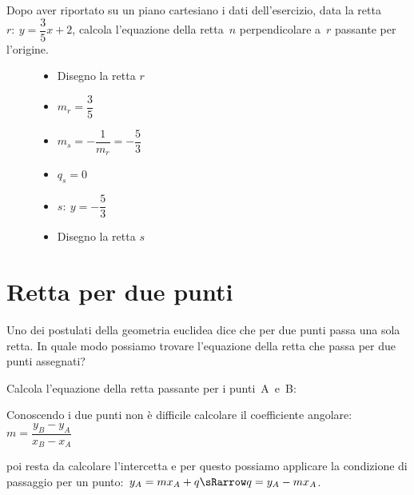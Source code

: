  \begin{esempio}
Dopo aver riportato su un piano cartesiano i dati dell'esercizio,
data la retta~\(r:~y = \dfrac{3}{5} x +2\), calcola l'equazione della 
retta~\(n\) perpendicolare a~\(r\) passante per l'origine.

\begin{inaccessibleblock}
 \begin{figure}[h]
\centering \hspace{-5mm}
 \begin{minipage}[]{.40\textwidth}
  \begin{itemize}
  \item Disegno la retta \(r\)
  \item \(m_r = \dfrac{3}{5}\)
  \item \(m_s = - \dfrac{1}{m_r} = -\dfrac{5}{3}\)
  \item \(q_s = 0\)
  \item \(s:~ y= -\dfrac{5}{3}\)
  \item Disegno la retta \(s\)
  \end{itemize}
 \end{minipage}
 \begin{minipage}[]{.60\textwidth}
   \centering \esempioperp
 \end{minipage}
\label{fig:esempioperp}
\end{figure}
\end{inaccessibleblock}
 \end{esempio}


\section{Retta per due punti}
\label{sec:retta_rettaperduepunti}

Uno dei postulati della geometria euclidea dice che per due punti passa una sola retta. 
In quale modo possiamo trovare l'equazione della retta che passa per due 
punti assegnati?

\begin{procedura}
 Calcola l'equazione della retta passante per i punti~A~e~B:
 \begin{enumeratea}
  \item Conoscendo i due punti non è difficile calcolare il coefficiente 
   angolare:~\(m = \dfrac{y_B - y_A}{x_B - x_A}\)
  \item poi resta da calcolare l'intercetta e per questo possiamo applicare 
   la condizione di passaggio per un 
   punto:~\(y_A = m x_A + q \sRarrow q = y_A - m x_A\).
 \end{enumeratea}
\end{procedura}


